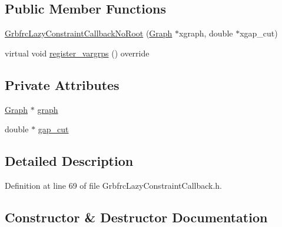 \subsection*{Public Member Functions}
\begin{DoxyCompactItemize}
\item 
\hyperlink{classderegnet_1_1GrbfrcLazyConstraintCallbackNoRoot_a89ebb5a3dfa9156849b68adf27d86c02}{Grbfrc\+Lazy\+Constraint\+Callback\+No\+Root} (\hyperlink{namespacederegnet_a55b76c55bbabc682cbc61f8b9948799e}{Graph} $\ast$xgraph, double $\ast$xgap\+\_\+cut)
\item 
virtual void \hyperlink{classderegnet_1_1GrbfrcLazyConstraintCallbackNoRoot_a4e6595d467c68a9b94f393991df04bbd}{register\+\_\+vargrps} () override
\end{DoxyCompactItemize}
\subsection*{Private Attributes}
\begin{DoxyCompactItemize}
\item 
\hyperlink{namespacederegnet_a55b76c55bbabc682cbc61f8b9948799e}{Graph} $\ast$ \hyperlink{classderegnet_1_1GrbfrcLazyConstraintCallbackNoRoot_a0c5b7bfa966879cc74fea0ea1c5c864c}{graph}
\item 
double $\ast$ \hyperlink{classderegnet_1_1GrbfrcLazyConstraintCallbackNoRoot_ac8425029e6bb6929bc08c261f203cccf}{gap\+\_\+cut}
\end{DoxyCompactItemize}


\subsection{Detailed Description}


Definition at line 69 of file Grbfrc\+Lazy\+Constraint\+Callback.\+h.



\subsection{Constructor \& Destructor Documentation}
